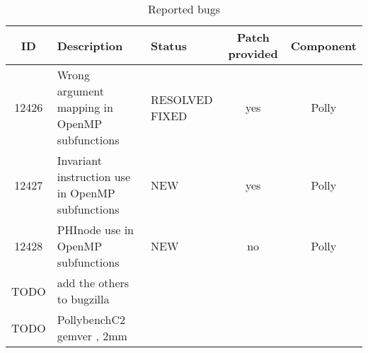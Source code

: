 \begin{table}[htbp]
  \caption{Reported bugs}
  \begin{tabularx}{0.9\textwidth}{ c | X | p{2cm} | c | c }
   ID & Description & Status & Patch provided  & Component \\
  \hline \hline
  12426 & Wrong argument mapping in OpenMP subfunctions & RESOLVED FIXED & yes & Polly \\
   \hline
  12427 & Invariant instruction use in OpenMP subfunctions & NEW & yes & Polly \\
   \hline
  12428 & PHInode use in OpenMP subfunctions & NEW & no & Polly \\
   \hline
  TODO & add the others to bugzilla & & & \\
  TODO & PollybenchC2 gemver , 2mm & & & \\
  \end{tabularx}
  \label{tab:bugreports}
\end{table}
